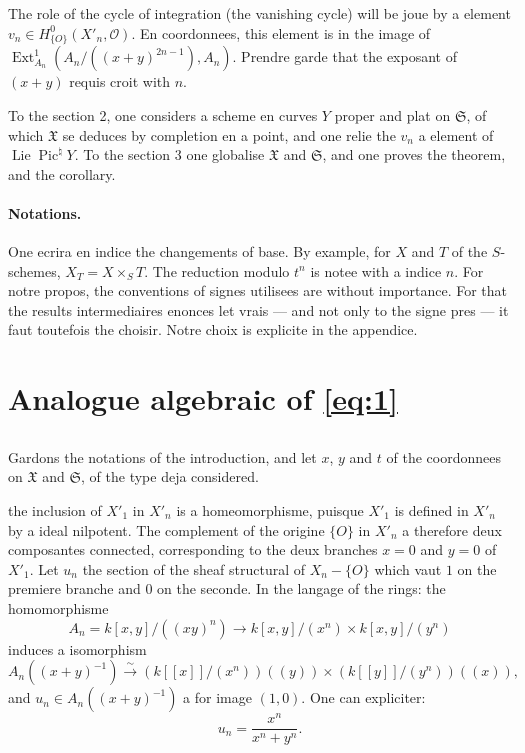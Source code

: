 \documentclass[12pt,a4paper]{article}
\theoremstyle{plain}
\theoremstyle{definition}
\theoremstyle{remark}
\DeclareMathOperator{\Ext}{Ext}
\DeclareMathOperator{\Lie}{Lie}
\DeclareMathOperator{\Pic}{Pic}
\newcommand{\OO}{\mathcal{O}}
\providecommand{\Ext}{\operatorname{Ext}}
\providecommand{\Lie}{\operatorname{Lie}}
\begin{document}
The role of the cycle of integration (the vanishing cycle) will be joue by a element
$v_n\in H^0_{\{O\}}(X'_n,\OO)$. En coordonnees, this element is in the image of
$\Ext^1_{A_n}(A_n/((x+y)^{2n-1}),A_n)$. Prendre garde that the exposant of $(x+y)$ requis croit
with $n$.

To the section 2, one considers a scheme en curves $Y$ proper and plat on
$\mathfrak{S}$, of which $\mathfrak{X}$ se deduces by completion en a point, and one relie the
$v_n$ a element of $\Lie\Pic^\natural Y$. To the section 3 one globalise
$\mathfrak{X}$ and $\mathfrak{S}$, and one proves the theorem, and the corollary.

\paragraph{Notations.} One ecrira en indice the changements of base. By example, for $X$
and $T$ of the $S$-schemes, $X_T=X\times_S T$. The reduction modulo $t^n$ is notee with a
indice $n$. For notre propos, the conventions of signes utilisees are without importance.
For that the results intermediaires enonces let vrais --- and not only to the signe
pres --- it faut toutefois the choisir. Notre choix is explicite in the appendice.


\section{Analogue algebraic of \eqref{eq:1}}

\subsection{}

Gardons the notations of the introduction, and let $x$, $y$ and $t$ of the coordonnees
on $\mathfrak{X}$ and $\mathfrak{S}$, of the type deja considered.

the inclusion of $X'_1$ in $X'_n$ is a homeomorphisme, puisque $X'_1$ is defined
in $X'_n$ by a ideal nilpotent. The complement of the origine $\{O\}$ in $X'_n$ a
therefore deux composantes connected, corresponding to the deux branches $x=0$ and $y=0$ of
$X'_1$. Let $u_n$ the section of the sheaf structural of $X_n-\{O\}$ which vaut $1$ on
the premiere branche and $0$ on the seconde. In the langage of the rings:
the homomorphisme
\[
A_n=k[x,y]/((xy)^n)\to k[x,y]/(x^n)\times k[x,y]/(y^n)
\]
induces a isomorphism
\[
A_n((x+y)^{-1})\xrightarrow{\sim}(k[[x]]/(x^n))((y))\times (k[[y]]/(y^n))((x)),
\]
and $u_n\in A_n((x+y)^{-1})$ a for image $(1,0)$. One can expliciter:
\begin{equation}\label{eq:1.1.1}
u_n=\frac{x^n}{x^n+y^n}.
\end{equation}
\end{document}
